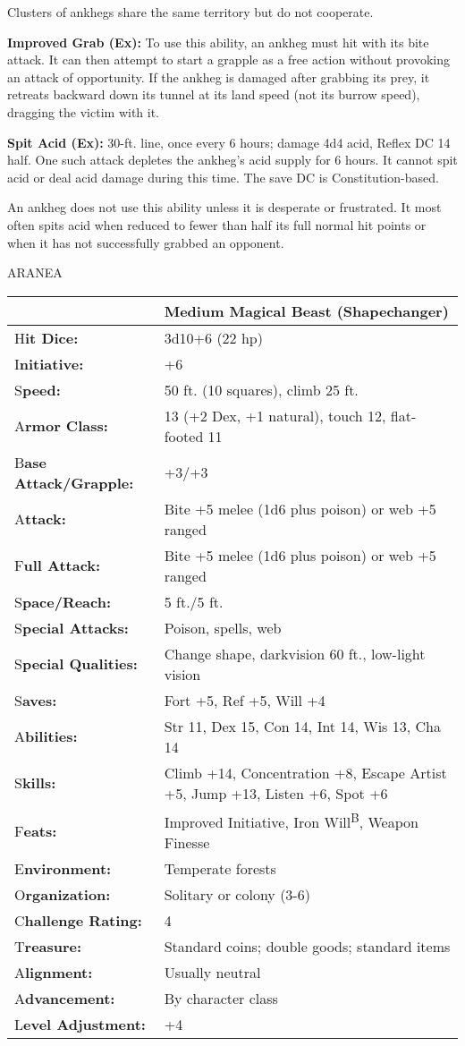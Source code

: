 \documentclass{article}
\begin{document}
Clusters of ankhegs share the same territory but do not cooperate.

\textbf{Improved Grab (Ex): }To use this ability, an ankheg must hit with its bite 
attack. It can then attempt to start a grapple as a free action without provoking 
an attack of opportunity. If the ankheg is damaged after grabbing its prey, it 
retreats backward down its tunnel at its land speed (not its burrow speed), dragging 
the victim with it.

\textbf{Spit Acid (Ex):} 30-ft. line, once every 6 hours; damage 4d4 acid, Reflex 
DC 14 half. One such attack depletes the ankheg's acid supply for 6 hours. It cannot 
spit acid or deal acid damage during this time. The save DC is Constitution-based.

An ankheg does not use this ability unless it is desperate or frustrated. It most 
often spits acid when reduced to fewer than half its full normal hit points or 
when it has not successfully grabbed an opponent.

\vspace{12pt}
{\LARGE{}ARANEA}

\begin{tabular}{|>{\raggedright}p{91pt}|>{\raggedright}p{204pt}|}
\hline
  & Medium Magical Beast (Shapechanger)\tabularnewline
\hline
H\textbf{it Dice:} & 3d10+6 (22 hp)\tabularnewline
\hline
I\textbf{nitiative:} & +6\tabularnewline
\hline
S\textbf{peed:} & 50 ft. (10 squares), climb 25 ft.\tabularnewline
\hline
A\textbf{rmor Class:} & 13 (+2 Dex, +1 natural), touch 12, flat-footed 11\tabularnewline
\hline
B\textbf{ase Attack/Grapple:} & +3/+3\tabularnewline
\hline
A\textbf{ttack:} & Bite +5 melee (1d6 plus poison) or web +5 ranged\tabularnewline
\hline
F\textbf{ull Attack:} & Bite +5 melee (1d6 plus poison) or web +5 ranged\tabularnewline
\hline
S\textbf{pace/Reach:} & 5 ft./5 ft.\tabularnewline
\hline
S\textbf{pecial Attacks:} & Poison, spells, web\tabularnewline
\hline
S\textbf{pecial Qualities:} & Change shape, darkvision 60 ft., low-light vision\tabularnewline
\hline
S\textbf{aves:} & Fort +5, Ref +5, Will +4\tabularnewline
\hline
A\textbf{bilities:} & Str 11, Dex 15, Con 14, Int 14, Wis 13, Cha 14\tabularnewline
\hline
S\textbf{kills:} & Climb +14, Concentration +8, Escape Artist +5, Jump +13, Listen 
+6, Spot +6\tabularnewline
\hline
F\textbf{eats:} & Improved Initiative, Iron Will\textsuperscript{B}, Weapon Finesse\tabularnewline
\hline
E\textbf{nvironment:} & Temperate forests\tabularnewline
\hline
O\textbf{rganization:} & Solitary or colony (3-6)\tabularnewline
\hline
C\textbf{hallenge Rating:} & 4\tabularnewline
\hline
T\textbf{reasure:} & Standard coins; double goods; standard items\tabularnewline
\hline
A\textbf{lignment:} & Usually neutral\tabularnewline
\hline
A\textbf{dvancement:} & By character class\tabularnewline
\hline
L\textbf{evel Adjustment:} & +4\tabularnewline
\hline
\end{tabular}
\end{document}
